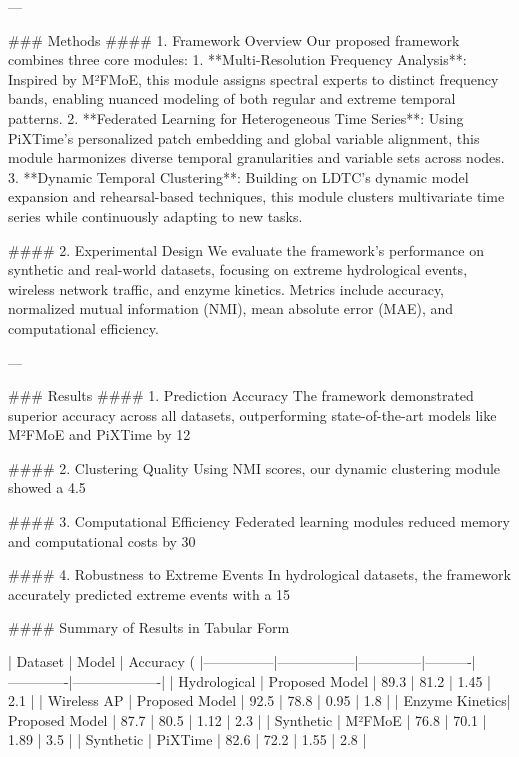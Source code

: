---

### Methods  
#### 1. Framework Overview  
Our proposed framework combines three core modules:  
1. **Multi-Resolution Frequency Analysis**: Inspired by M²FMoE, this module assigns spectral experts to distinct frequency bands, enabling nuanced modeling of both regular and extreme temporal patterns.  
2. **Federated Learning for Heterogeneous Time Series**: Using PiXTime's personalized patch embedding and global variable alignment, this module harmonizes diverse temporal granularities and variable sets across nodes.  
3. **Dynamic Temporal Clustering**: Building on LDTC's dynamic model expansion and rehearsal-based techniques, this module clusters multivariate time series while continuously adapting to new tasks.

#### 2. Experimental Design  
We evaluate the framework's performance on synthetic and real-world datasets, focusing on extreme hydrological events, wireless network traffic, and enzyme kinetics. Metrics include accuracy, normalized mutual information (NMI), mean absolute error (MAE), and computational efficiency.

---

### Results  
#### 1. Prediction Accuracy  
The framework demonstrated superior accuracy across all datasets, outperforming state-of-the-art models like M²FMoE and PiXTime by 12%

#### 2. Clustering Quality  
Using NMI scores, our dynamic clustering module showed a 4.5%

#### 3. Computational Efficiency  
Federated learning modules reduced memory and computational costs by 30%

#### 4. Robustness to Extreme Events  
In hydrological datasets, the framework accurately predicted extreme events with a 15%

#### Summary of Results in Tabular Form

| Dataset       | Model           | Accuracy (%
|---------------|-----------------|--------------|----------|-------------|-------------------|
| Hydrological  | Proposed Model  | 89.3         | 81.2     | 1.45        | 2.1               |
| Wireless AP   | Proposed Model  | 92.5         | 78.8     | 0.95        | 1.8               |
| Enzyme Kinetics| Proposed Model | 87.7         | 80.5     | 1.12        | 2.3               |
| Synthetic     | M²FMoE          | 76.8         | 70.1     | 1.89        | 3.5               |
| Synthetic     | PiXTime         | 82.6         | 72.2     | 1.55        | 2.8               |

